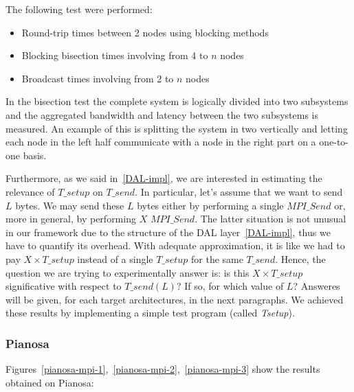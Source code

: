 The following test were performed:
\begin{itemize}
	\item Round-trip times between 2 nodes using blocking methods
	\item Blocking bisection times involving from 4 to $n$ nodes
	\item Broadcast times involving from 2 to $n$ nodes
\end{itemize}
In the bisection test the complete system is logically divided into two subsystems and the aggregated bandwidth and latency between the two subsystems is measured. An example of this is splitting the system in two vertically and letting each node in the left half communicate with a node in the right part on a one-to-one basis.

Furthermore, as we said in~\ref{DAL-impl}, we are interested in estimating the relevance of $T\_setup$ on $T\_send$. In particular, let's assume that we want to send $L$ bytes. We may send these $L$ bytes either by performing a single $MPI\_Send$ or, more in general, by performing $X$ $MPI\_Send$. The latter situation is not unusual in our framework due to the structure of the DAL layer~\ref{DAL-impl}, thus we have to quantify its overhead. With adequate approximation, it is like we had to pay $X \times T\_setup$ instead of a single $T\_setup$ for the same $T\_send$. Hence, the question we are trying to experimentally answer is: is this $X \times T\_setup$ significative with respect to $T\_send (L)$? If so, for which value of $L$? Answeres will be given, for each target architectures, in the next paragraphs. We achieved these results by implementing a simple test program (called \textit{Tsetup}).

\subsubsection*{Pianosa}
\label{test-env-pianosa}
Figures~\ref{pianosa-mpi-1},~\ref{pianosa-mpi-2},~\ref{pianosa-mpi-3} show the results obtained on Pianosa:

